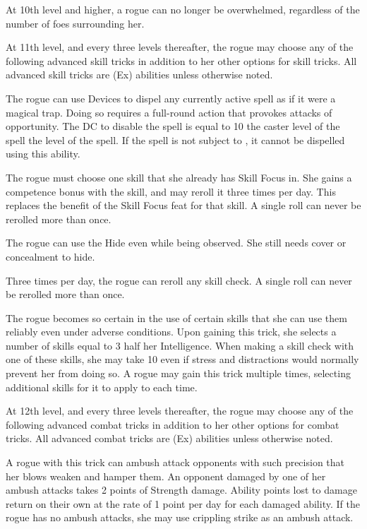  At 10th level and higher, a rogue can no longer be overwhelmed, regardless of the number of foes surrounding her.

 At 11th level, and every three levels thereafter, the rogue may choose any of the following advanced skill tricks in addition to her other options for skill tricks. All advanced skill tricks are (Ex) abilities unless otherwise noted.

 The rogue can use Devices to dispel any currently active spell as if it were a magical trap. Doing so requires a full-round action that provokes attacks of opportunity. The DC to disable the spell is equal to 10 \add the caster level of the spell \add the level of the spell. If the spell is not subject to , it cannot be dispelled using this ability.

 The rogue must choose one skill that she already has Skill Focus in. She gains a  competence bonus with the skill, and may reroll it three times per day. This replaces the benefit of the Skill Focus feat for that skill. A single roll can never be rerolled more than once.

 The rogue can use the Hide even while being observed. She still needs cover or concealment to hide.

 Three times per day, the rogue can reroll any skill check. A single roll can never be rerolled more than once.

 The rogue becomes so certain in the use of certain skills that she can use them reliably even under adverse conditions. Upon gaining this trick, she selects a number of skills equal to 3 \add half her Intelligence. When making a skill check with one of these skills, she may take 10 even if stress and distractions would normally prevent her from doing so. A rogue may gain this trick multiple times, selecting additional skills for it to apply to each time.

 At 12th level, and every three levels thereafter, the rogue may choose any of the following advanced combat tricks in addition to her other options for combat tricks. All advanced combat tricks are (Ex) abilities unless otherwise noted.

 A rogue with this trick can ambush attack opponents with such precision that her blows weaken and hamper them. An opponent damaged by one of her ambush attacks takes 2 points of Strength damage. Ability points lost to damage return on their own at the rate of 1 point per day for each damaged ability. If the rogue has no ambush attacks, she may use crippling strike as an ambush attack.

